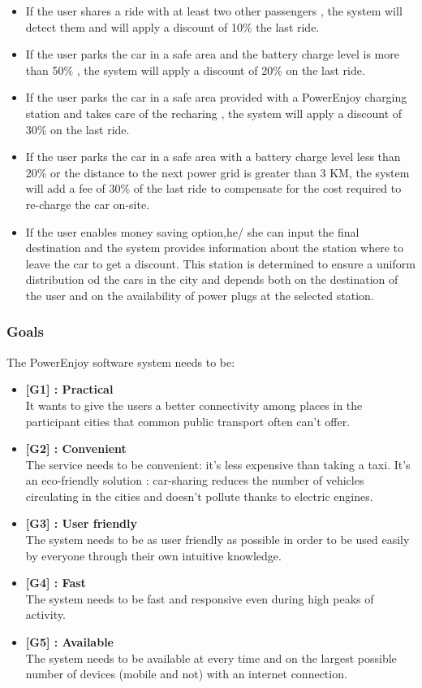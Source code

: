 \documentclass[12pt]{article}
\begin{document}
	\begin{itemize}
	\item If the user shares a ride with at least two other passengers , the system will detect them and will apply a discount of 10\% the last ride.
	\item If the user parks the car in a safe area and the battery charge level is more than 50\% , the system will apply a discount of 20\% on the last ride.
	\item If the user parks the car in a safe area provided with a PowerEnjoy charging station and takes care of the recharing , the system will apply a discount of 30\% on the last ride.
	\item If the user parks the car in a safe area with a battery charge level less than 20\% or the distance to the next power grid is greater than 3 KM, the system will add a fee of 30\% of the last ride to compensate for the cost required to re-charge the car on-site.
	\item If the user enables money saving option,he/ she can input the final destination and the system provides information about the station where to leave the car to get a discount. This station is determined to ensure a uniform distribution od the cars in the city and depends both on the destination of the user and on the availability of power plugs at the selected station.
	\end{itemize}
	\subsubsection{Goals}
	The PowerEnjoy software system needs to be:
	\begin{itemize}
		\item \textbf{[G1] : Practical}\\It wants to give the users a better connectivity among places in the participant cities that common public transport often can't offer.
		\item \textbf{[G2] : Convenient}\\The service needs to be convenient: it's less expensive than taking a taxi. It's an eco-friendly solution : car-sharing reduces the number of vehicles circulating in the cities and doesn't pollute thanks to electric engines.
		\item \textbf{[G3] : User friendly}\\ The system needs to be as user friendly as possible in order to be used easily by everyone through their own intuitive knowledge. 
		\item \textbf{[G4] : Fast}\\ The system needs to be fast and responsive even during high peaks of activity.
		\item \textbf{[G5] : Available}\\ The system needs to be available at every time and on the largest possible number of devices (mobile and not) with an internet connection.
	\end{itemize}
	
\end{document}
